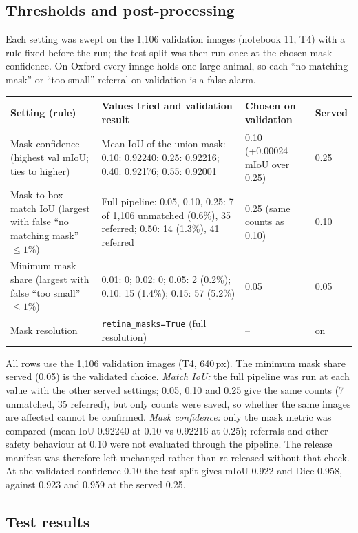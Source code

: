 \documentclass[11pt,a4paper]{article}
\begin{document}
\subsection{Thresholds and post-processing}

Each setting was swept on the 1,106 validation images (notebook 11, T4) with a rule fixed before the run; the test split was then run once at the chosen mask confidence. On Oxford every image holds one large animal, so each ``no matching mask'' or ``too small'' referral on validation is a false alarm.

{\small
\begin{tabularx}{\linewidth}{@{}P{3.0cm} Y P{3.4cm} l@{}}
\toprule
Setting (rule) & Values tried and validation result & Chosen on validation & Served \\
\midrule
Mask confidence (highest val mIoU; ties to higher) & Mean IoU of the union mask: 0.10: 0.92240; 0.25: 0.92216; 0.40: 0.92176; 0.55: 0.92001 & 0.10 (+0.00024 mIoU over 0.25) & 0.25 \\
Mask-to-box match IoU (largest with false ``no matching mask'' $\leq1\%$) & Full pipeline: 0.05, 0.10, 0.25: 7 of 1,106 unmatched (0.6\%), 35 referred; 0.50: 14 (1.3\%), 41 referred & 0.25 (same counts as 0.10) & 0.10 \\
Minimum mask share (largest with false ``too small'' $\leq1\%$) & 0.01: 0; 0.02: 0; 0.05: 2 (0.2\%); 0.10: 15 (1.4\%); 0.15: 57 (5.2\%) & 0.05 & 0.05 \\
Mask resolution & \texttt{retina\_masks=True} (full resolution) & -- & on \\
\bottomrule
\end{tabularx}}

\smallskip
All rows use the 1,106 validation images (T4, 640\,px). The minimum mask share served (0.05) is the validated choice. \emph{Match IoU:} the full pipeline was run at each value with the other served settings; 0.05, 0.10 and 0.25 give the same counts (7 unmatched, 35 referred), but only counts were saved, so whether the same images are affected cannot be confirmed. \emph{Mask confidence:} only the mask metric was compared (mean IoU 0.92240 at 0.10 vs 0.92216 at 0.25); referrals and other safety behaviour at 0.10 were not evaluated through the pipeline. The release manifest was therefore left unchanged rather than re-released without that check. At the validated confidence 0.10 the test split gives mIoU 0.922 and Dice 0.958, against 0.923 and 0.959 at the served 0.25.

\newpage
\subsection{Test results}
\end{document}
